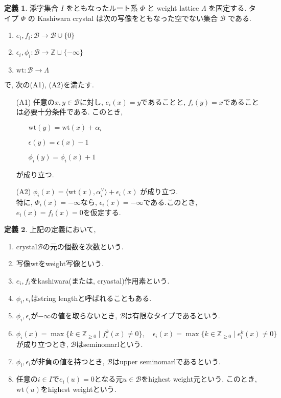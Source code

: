 \documentclass[a4,12pt, titlepage]{jarticle}
\theoremstyle{definition}
\newtheorem{df}{定義}
\begin{document}
\begin{df}
  添字集合 $I$ をともなったルート系 $\Phi$ と weight lattice $\Lambda$ を固定する.
  タイプ $\Phi$ の Kashiwara crystal は次の写像をともなった空でない集合 $\mathscr{B}$ である.
  \begin{enumerate}
    \item $e_i, f_i : \mathscr{B} \to \mathscr{B} \cup \{ 0 \}$
    \item $\epsilon_i, \phi_i : \mathscr{B} \to \mathbb{Z} \sqcup \{ - \infty \}$
    \item $\mathrm{wt} : \mathscr{B} \to \Lambda$
  \end{enumerate}
  で, 次の(A1), (A2)を満たす.
  \begin{enumerate}
    \item [(A1)] 任意の$x, y \in \mathscr{B}$に対し, $e_i(x) = y $であることと, $f_i(y) = x $であることは必要十分条件である.
    このとき, 
    \begin{enumerate}
      \item [] $\mathrm{wt}(y) = \mathrm{wt}(x) + \alpha_i$
      \item [] $\epsilon(y) = \epsilon(x) - 1$
      \item [] $\phi_i(y) = \phi_i(x) + 1 $
    \end{enumerate}
    が成り立つ.
    \item [(A2)] $\phi_i(x) = \langle \mathrm{wt}(x), \alpha_i ^{ \vee } \rangle + \epsilon_i(x) $
    が成り立つ.\\
    特に, $\Phi_i(x) = - \infty$なら, $\epsilon_i(x) = - \infty $である.このとき, $e_i(x) = f_i(x) = 0$を仮定する.
  \end{enumerate}
\end{df}

\begin{df} 上記の定義において,
  \begin{enumerate}
    \item crystal$\mathscr{B}$の元の個数を次数という.
    \item 写像$\mathrm{wt}$をweight写像という.
    \item $e_i, f_i$をkashiwara(または, cryastal)作用素という.
    \item $\phi_i, \epsilon_i$はstring lengthと呼ばれることもある.
    \item $\phi_i, \epsilon_i$が$- \infty $の値を取らないとき, $\mathscr{B}$は有限なタイプであるという.
    \item $\phi_i(x) = \max\{ k \in \mathbb{Z}_{\geq 0} \mid f_i^k(x) \neq 0 \}, \quad \epsilon_i(x) = \max\{ k \in \mathbb{Z}_{\geq 0} \mid e_i^k(x) \neq 0 \}$ \\
    が成り立つとき, $\mathscr{B}$はseminomarlという.
    \item $\phi_i, \epsilon_i$が非負の値を持つとき, $\mathscr{B}$はupper seminomarlであるという.
    \item 任意の$i \in I$で$e_i(u) = 0$となる元$u \in \mathscr{B}$をhighest weight元という. このとき, $\mathrm{wt}(u)$をhighest weightという.
  \end{enumerate}
\end{df}
\end{document}

